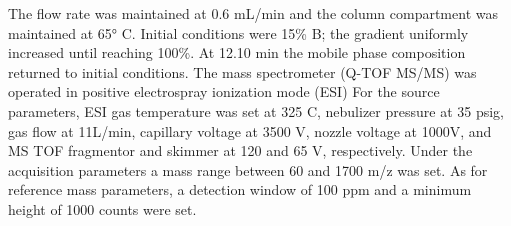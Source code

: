 \documentclass[9pt,twocolumn,twoside,lineno]{BioRxiv}
\begin{document}
The flow rate was maintained at 0.6 mL/min and the column compartment was maintained at 65° C. Initial conditions were 15\% B; the gradient uniformly increased until reaching 100\%. 
At 12.10 min the mobile phase composition returned to initial conditions.
The mass spectrometer (Q-TOF MS/MS) was operated in positive electrospray ionization mode (ESI)
For the source parameters, ESI gas temperature was set at 325 \degree C, nebulizer pressure at 35 psig, gas flow at 11L/min, capillary voltage at 3500 V, nozzle voltage at 1000V, and MS TOF fragmentor and skimmer at 120 and 65 V, respectively.
Under the acquisition parameters a mass range between 60 and 1700 m/z was set. As for reference mass parameters, a detection window of 100 ppm and a minimum height of 1000 counts were set. 

\end{document}
